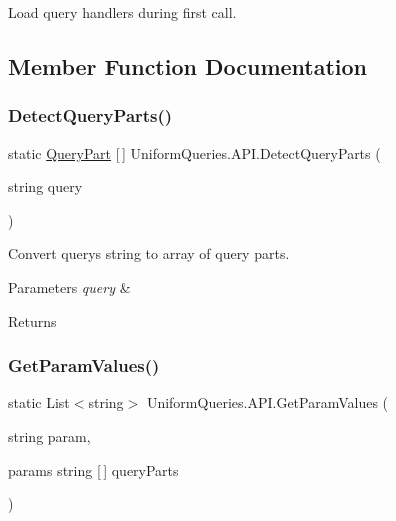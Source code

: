 Load query handlers during first call. 



\subsection{Member Function Documentation}
\mbox{\label{class_uniform_queries_1_1_a_p_i_a013ca0eff0e67d7f30a6be289312b859}} 
\subsubsection{\texorpdfstring{Detect\+Query\+Parts()}{DetectQueryParts()}}
{\footnotesize\ttfamily static \mbox{\hyperlink{struct_uniform_queries_1_1_query_part}{Query\+Part}} \mbox{[}$\,$\mbox{]} Uniform\+Queries.\+A\+P\+I.\+Detect\+Query\+Parts (\begin{DoxyParamCaption}\item[{string}]{query }\end{DoxyParamCaption})\hspace{0.3cm}{\ttfamily [static]}}



Convert query\textquotesingle{}s string to array of query parts. 


\begin{DoxyParams}{Parameters}
{\em query} & \\
\hline
\end{DoxyParams}
\begin{DoxyReturn}{Returns}

\end{DoxyReturn}
\mbox{\label{class_uniform_queries_1_1_a_p_i_aa8a8215bbad2752c291803011dc49ff4}} 
\subsubsection{\texorpdfstring{Get\+Param\+Values()}{GetParamValues()}\hspace{0.1cm}{\footnotesize\ttfamily [1/2]}}
{\footnotesize\ttfamily static List$<$string$>$ Uniform\+Queries.\+A\+P\+I.\+Get\+Param\+Values (\begin{DoxyParamCaption}\item[{string}]{param,  }\item[{params string \mbox{[}$\,$\mbox{]}}]{query\+Parts }\end{DoxyParamCaption})\hspace{0.3cm}{\ttfamily [static]}}




